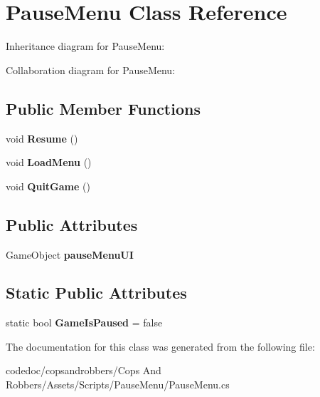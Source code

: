 \hypertarget{classPauseMenu}{}\section{Pause\+Menu Class Reference}
\label{classPauseMenu}


Inheritance diagram for Pause\+Menu\+:


Collaboration diagram for Pause\+Menu\+:
\subsection*{Public Member Functions}
\begin{DoxyCompactItemize}
\item 
\mbox{\label{classPauseMenu_a4416b25e65dfadf57cd8657eaf94f7df}} 
void {\bfseries Resume} ()
\item 
\mbox{\label{classPauseMenu_ae4e1559b2fa04a8bb22fc2f8650433c8}} 
void {\bfseries Load\+Menu} ()
\item 
\mbox{\label{classPauseMenu_a833077a2752465d59d0e7e5ad756b7ab}} 
void {\bfseries Quit\+Game} ()
\end{DoxyCompactItemize}
\subsection*{Public Attributes}
\begin{DoxyCompactItemize}
\item 
\mbox{\label{classPauseMenu_a49305f37ccebc2342ea009f5cb259fee}} 
Game\+Object {\bfseries pause\+Menu\+UI}
\end{DoxyCompactItemize}
\subsection*{Static Public Attributes}
\begin{DoxyCompactItemize}
\item 
\mbox{\label{classPauseMenu_a4ca5f2ef5197fa89f9ecb4d6d4f47560}} 
static bool {\bfseries Game\+Is\+Paused} = false
\end{DoxyCompactItemize}


The documentation for this class was generated from the following file\+:\begin{DoxyCompactItemize}
\item 
codedoc/copsandrobbers/\+Cops And Robbers/\+Assets/\+Scripts/\+Pause\+Menu/Pause\+Menu.\+cs\end{DoxyCompactItemize}
